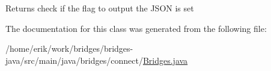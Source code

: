 \begin{DoxyReturn}{Returns}
check if the flag to output the J\+S\+ON is set 
\end{DoxyReturn}


The documentation for this class was generated from the following file\+:\begin{DoxyCompactItemize}
\item 
/home/erik/work/bridges/bridges-\/java/src/main/java/bridges/connect/\hyperlink{_bridges_8java}{Bridges.\+java}\end{DoxyCompactItemize}
